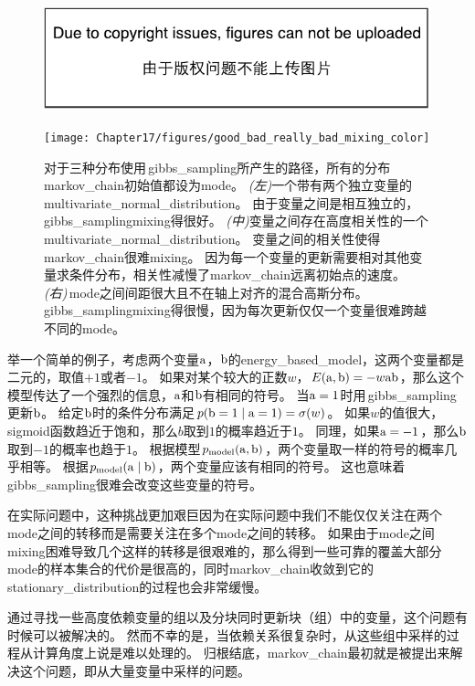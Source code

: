 \begin{figure}[!htb]
\ifOpenSource
\centerline{\includegraphics{figure.pdf}}
\else
	\centerline{\texttt{[image: Chapter17/figures/good\_bad\_really\_bad\_mixing\_color]}}
\fi
\caption{对于三种分布使用\,\gls{gibbs_sampling}所产生的路径，所有的分布\gls{markov_chain}初始值都设为\gls{mode}。
\emph{(左)}一个带有两个独立变量的\gls{multivariate_normal_distribution}。
由于变量之间是相互独立的，\gls{gibbs_sampling}\gls{mixing}得很好。
\emph{(中)}变量之间存在高度相关性的一个\gls{multivariate_normal_distribution}。
变量之间的相关性使得\gls{markov_chain}很难\gls{mixing}。
因为每一个变量的更新需要相对其他变量求条件分布，相关性减慢了\gls{markov_chain}远离初始点的速度。
\emph{(右)}\,\gls{mode}之间间距很大且不在轴上对齐的混合高斯分布。
\gls{gibbs_sampling}\gls{mixing}得很慢，因为每次更新仅仅一个变量很难跨越不同的\gls{mode}。}
\label{fig:chap17_good_bad_really_bad_mixing_color}
\end{figure}


举一个简单的例子，考虑两个变量$\mathrm{a}$，$\mathrm{b}$的\gls{energy_based_model}，这两个变量都是二元的，取值$+1$或者$-1$。   %
如果对某个较大的正数$w$，$E(\mathrm{a},\mathrm{b}) = - w \mathrm{a} \mathrm{b}$，那么这个模型传达了一个强烈的信息，$\mathrm{a}$和$\mathrm{b}$有相同的符号。
当$\mathrm{a}=1$时用\,\gls{gibbs_sampling}更新$\mathrm{b}$。
给定$\mathrm{b}$时的条件分布满足$p(\mathrm{b}=1\mid \mathrm{a}=1) = \sigma(w)$。
如果$w$的值很大，\gls{sigmoid}函数趋近于饱和，那么$b$取到$1$的概率趋近于$1$。
同理，如果$\mathrm{a}=-1$，那么$\mathrm{b}$取到$-1$的概率也趋于$1$。 
根据模型$p_{\text{model}}(\mathrm{a},\mathrm{b})$，两个变量取一样的符号的概率几乎相等。
根据$p_{\text{model}}(\mathrm{a}\mid \mathrm{b})$，两个变量应该有相同的符号。
这也意味着\,\gls{gibbs_sampling}很难会改变这些变量的符号。

在实际问题中，这种挑战更加艰巨因为在实际问题中我们不能仅仅关注在两个\gls{mode}之间的转移而是需要关注在多个\gls{mode}之间的转移。 
如果由于\gls{mode}之间\gls{mixing}困难导致几个这样的转移是很艰难的，那么得到一些可靠的覆盖大部分\gls{mode}的样本集合的代价是很高的，同时\gls{markov_chain}收敛到它的\gls{stationary_distribution}的过程也会非常缓慢。

通过寻找一些高度依赖变量的组以及分块同时更新块（组）中的变量，这个问题有时候可以被解决的。
然而不幸的是，当依赖关系很复杂时，从这些组中采样的过程从计算角度上说是难以处理的。
归根结底，\gls{markov_chain}最初就是被提出来解决这个问题，即从大量变量中采样的问题。

